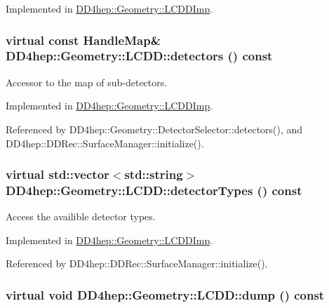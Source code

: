 Implemented in \hyperlink{class_d_d4hep_1_1_geometry_1_1_l_c_d_d_imp_a31d7d48549b622ff2aef524cc1996993}{DD4hep::Geometry::LCDDImp}.\hypertarget{class_d_d4hep_1_1_geometry_1_1_l_c_d_d_ad06f71146140dc2682bc586ba7bffeaf}{
\subsubsection[{detectors}]{\setlength{\rightskip}{0pt plus 5cm}virtual const {\bf HandleMap}\& DD4hep::Geometry::LCDD::detectors () const}}
\label{class_d_d4hep_1_1_geometry_1_1_l_c_d_d_ad06f71146140dc2682bc586ba7bffeaf}


Accessor to the map of sub-\/detectors. 

Implemented in \hyperlink{class_d_d4hep_1_1_geometry_1_1_l_c_d_d_imp_a7ec6dc28b69a23fcdaff59e73fc7c440}{DD4hep::Geometry::LCDDImp}.

Referenced by DD4hep::Geometry::DetectorSelector::detectors(), and DD4hep::DDRec::SurfaceManager::initialize().\hypertarget{class_d_d4hep_1_1_geometry_1_1_l_c_d_d_a196cc776b69db52d89f3396bf03d224f}{
\subsubsection[{detectorTypes}]{\setlength{\rightskip}{0pt plus 5cm}virtual std::vector$<$std::string$>$ DD4hep::Geometry::LCDD::detectorTypes () const}}
\label{class_d_d4hep_1_1_geometry_1_1_l_c_d_d_a196cc776b69db52d89f3396bf03d224f}


Access the availible detector types. 

Implemented in \hyperlink{class_d_d4hep_1_1_geometry_1_1_l_c_d_d_imp_a5d48161088950c2686eee7f28d58fde3}{DD4hep::Geometry::LCDDImp}.

Referenced by DD4hep::DDRec::SurfaceManager::initialize().\hypertarget{class_d_d4hep_1_1_geometry_1_1_l_c_d_d_aa67b3fbf93d48e08c08b60cdd83b729f}{
\subsubsection[{dump}]{\setlength{\rightskip}{0pt plus 5cm}virtual void DD4hep::Geometry::LCDD::dump () const}}
\label{class_d_d4hep_1_1_geometry_1_1_l_c_d_d_aa67b3fbf93d48e08c08b60cdd83b729f}


